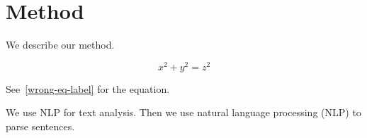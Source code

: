 \documentclass{article}
\begin{document}
\section{Method}
\label{method-section}

We describe our method.

\begin{equation}
  x^2 + y^2 = z^2
  \label{wrong-eq-label}
\end{equation}

See~\ref{wrong-eq-label} for the equation.

We use NLP for text analysis.
Then we use natural language processing (NLP) to parse sentences.

\end{document}
